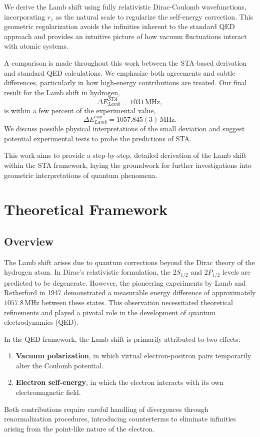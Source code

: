 \documentclass[12pt]{article}
\begin{document}
We derive the Lamb shift using fully relativistic Dirac-Coulomb wavefunctions, incorporating \(r_z\) as the natural scale to regularize the self-energy correction. This geometric regularization avoids the infinities inherent to the standard QED approach and provides an intuitive picture of how vacuum fluctuations interact with atomic systems.

A comparison is made throughout this work between the STA-based derivation and standard QED calculations. We emphasize both agreements and subtle differences, particularly in how high-energy contributions are treated. Our final result for the Lamb shift in hydrogen,
\[
\Delta E_{Lamb}^{STA} = 1031\,\mathrm{MHz},
\]
is within a few percent of the experimental value,
\[
\Delta E_{Lamb}^{exp} = 1057.845(3)\,\mathrm{MHz}.
\]
We discuss possible physical interpretations of the small deviation and suggest potential experimental tests to probe the predictions of STA.

This work aims to provide a step-by-step, detailed derivation of the Lamb shift within the STA framework, laying the groundwork for further investigations into geometric interpretations of quantum phenomena.


\section{Theoretical Framework}\label{sec:framwork}

\subsection{Overview}\label{subsec:overview}

The Lamb shift arises due to quantum corrections beyond the Dirac theory of the hydrogen atom. In Dirac's relativistic formulation, the \(2S_{1/2}\) and \(2P_{1/2}\) levels are predicted to be degenerate. However, the pioneering experiments by Lamb and Retherford in 1947 demonstrated a measurable energy difference of approximately \(1057.8\,\mathrm{MHz}\) between these states. This observation necessitated theoretical refinements and played a pivotal role in the development of quantum electrodynamics (QED).

In the QED framework, the Lamb shift is primarily attributed to two effects:
\begin{enumerate}
    \item \textbf{Vacuum polarization}, in which virtual electron-positron pairs temporarily alter the Coulomb potential.
    \item \textbf{Electron self-energy}, in which the electron interacts with its own electromagnetic field.
\end{enumerate}
Both contributions require careful handling of divergences through renormalization procedures, introducing counterterms to eliminate infinities arising from the point-like nature of the electron.
\end{document}
